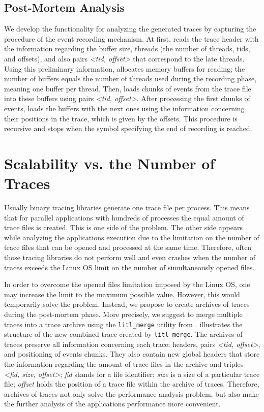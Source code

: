 \subsection{Post-Mortem Analysis}
We develop the functionality for analyzing the generated traces by capturing the
procedure of the event recording mechanism.
At first, \litl{} reads the trace header with the information 
regarding the buffer size, threads (the number of threads, tids, and 
offsets), and also pairs \emph{<tid, offset>} that correspond to the late 
threads. Using this preliminary information, \litl{} allocates memory buffers for 
reading; the number of buffers equals the number of threads used during the 
recording phase, meaning one buffer per thread. Then, \litl{} loads chunks of events 
from the trace file into these buffers using pairs \emph{<tid, offset>}. 
After processing the first chunks of events, \litl{} loads the buffers with the next 
ones using the information concerning their positions in the trace, which is 
given by the offsets. This procedure is recursive and stops when the symbol 
specifying the end of recording is reached.

\section{Scalability vs. the Number of Traces}
Usually binary tracing libraries generate one trace file per process. This means
that for parallel applications with hundreds of \mpi{} processes the equal 
amount of trace files is created. This is one side of the problem. The other 
side appears while analyzing the applications execution due to the limitation 
on the number of trace files that can be opened and processed at the same time. 
Therefore, often those tracing libraries do not perform well and even crashes 
when the number of traces exceeds the Linux OS limit on the number of 
simultaneously opened files.

In order to overcome the opened files limitation imposed by the Linux OS, one 
may increase the limit to the maximum possible value. However, this would 
temporarily solve the problem. Instead, we propose to create archives of traces 
during the post-mortem phase. More precisely, we suggest to merge multiple 
traces into a trace archive using the \texttt{litl\_merge} utility from \litl. 
 illustrates the structure of the new combined 
trace created by \texttt{litl\_merge}. The archives of traces preserve all 
information concerning each trace: headers, pairs \emph{<tid, offset>}, 
and positioning of events chunks. They also contain new global headers that 
store the information regarding the amount of trace files in the archive and 
triples \emph{<fid, size, offset>}; \emph{fid} stands for a file identifier; 
\emph{size} is a size of a particular trace file; \emph{offset} holds the 
position of a trace file within the archive of traces. Therefore, archives of 
traces not only solve the performance analysis problem, but also make the 
further analysis of the applications performance more convenient.

